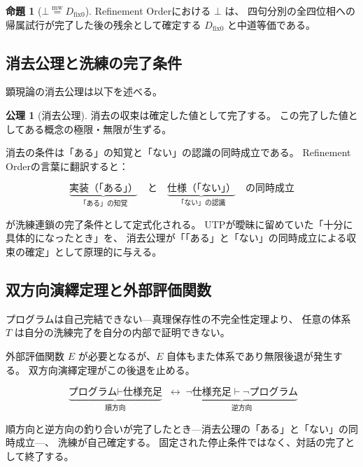 \documentclass[11pt,a4paper]{article}
\theoremstyle{definition}
\newtheorem{axiom}{公理}[section]
\newtheorem{proposition}{命題}[section]
\newcommand{\mweq}{\mathrel{\overset{\mathrm{mw}}{=}}}
\newcommand{\dfix}{D_{\mathrm{fix}0}}
\begin{document}
\begin{proposition}[$\bot \mweq \dfix$]
Refinement Orderにおける $\bot$ は、
四句分別の全四位相への帰属試行が完了した後の残余として確定する
$\dfix$ と中道等価である。
\end{proposition}

\subsection{消去公理と洗練の完了条件}

顕現論の消去公理\cite{Chiba2026_chikaku}は以下を述べる。

\begin{axiom}[消去公理]
消去の収束は確定した値として完了する。
この完了した値としてある概念の極限・無限が生ずる。
\end{axiom}

消去の条件は「ある」の知覚と「ない」の認識の同時成立である。
Refinement Orderの言葉に翻訳すると：

\begin{equation}
\underbrace{\text{実装（「ある」）}}_{\text{「ある」の知覚}} \quad \text{と} \quad
\underbrace{\text{仕様（「ない」）}}_{\text{「ない」の認識}} \quad \text{の同時成立}
\end{equation}

が洗練連鎖の完了条件として定式化される。
UTPが曖昧に留めていた「十分に具体的になったとき」を、
消去公理が「「ある」と「ない」の同時成立による収束の確定」として原理的に与える。

\subsection{双方向演繹定理と外部評価関数}

プログラムは自己完結できない---真理保存性の不完全性定理\cite{Chiba2026_incompleteness}より、
任意の体系 $T$ は自分の洗練完了を自分の内部で証明できない。

外部評価関数 $E$ が必要となるが、$E$ 自体もまた体系であり無限後退が発生する。
双方向演繹定理\cite{Chiba2026_bdt}がこの後退を止める。

\begin{equation}
\underbrace{\text{プログラム} \vdash \text{仕様充足}}_{\text{順方向}} \;\leftrightarrow\;
\underbrace{\neg\text{仕様充足} \vdash \neg\text{プログラム}}_{\text{逆方向}}
\end{equation}

順方向と逆方向の釣り合いが完了したとき---消去公理の「ある」と「ない」の同時成立---、
洗練が自己確定する。
固定された停止条件ではなく、対話の完了として終了する。
\end{document}
